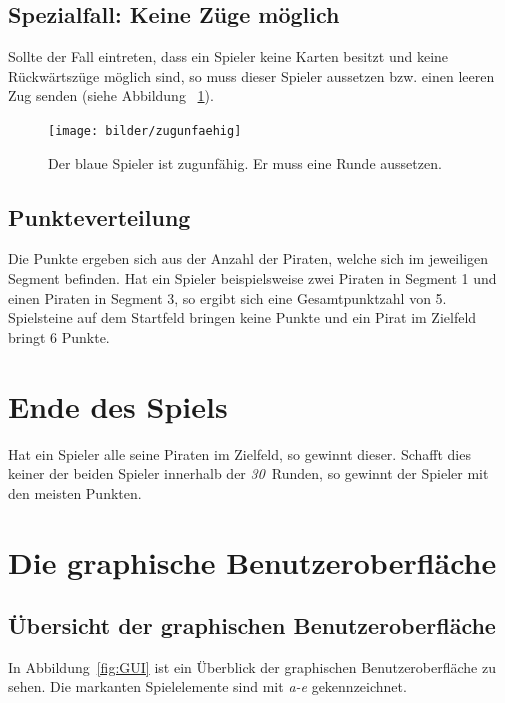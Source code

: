 \documentclass[a4paper, ngerman]{scrartcl}
\newcommand{\RundenAnzahl}{\emph{30}}
\begin{document}
\subsection{Spezialfall: Keine Züge möglich}
	
	Sollte der Fall eintreten, dass ein Spieler keine Karten besitzt und keine
	Rückwärtszüge möglich sind, so muss dieser Spieler aussetzen bzw. einen leeren
	Zug senden (siehe Abbildung ~\ref{fig:zugunfaehig}).
	\begin{figure}[h]
	 \centering
	 \texttt{[image: bilder/zugunfaehig]}
	 \caption{Der blaue Spieler ist zugunfähig. Er muss eine Runde aussetzen.}
	 \label{fig:zugunfaehig}
	\end{figure}
	
	\subsection{Punkteverteilung}
	Die Punkte ergeben sich aus der Anzahl der Piraten, welche sich im jeweiligen
	Segment befinden. Hat ein Spieler beispielsweise zwei Piraten in Segment 1 und
	einen Piraten in Segment 3, so ergibt sich eine Gesamtpunktzahl von 5.\\
	Spielsteine auf dem Startfeld bringen keine Punkte und ein Pirat im Zielfeld
	bringt 6 Punkte.
	
\section{Ende des Spiels}

	Hat ein Spieler alle seine Piraten im Zielfeld, so gewinnt dieser. Schafft dies
	keiner der beiden Spieler innerhalb der \RundenAnzahl\ Runden, so
	gewinnt der Spieler mit den meisten Punkten.
	
\section{Die graphische Benutzeroberfläche}
\subsection{Übersicht der graphischen Benutzeroberfläche}
	In Abbildung~\ref{fig:GUI} ist ein Überblick der graphischen Benutzeroberfläche
	zu sehen. Die markanten Spielelemente sind mit \emph{a-e} gekennzeichnet.
	
\end{document}
